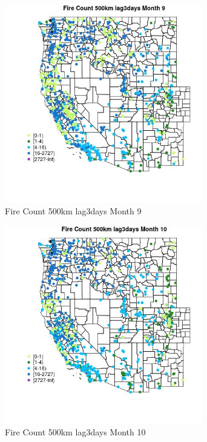 \begin{figure} 
\centering  
\includegraphics[width=0.77\textwidth]{Code_Outputs/Report_ML_input_PM25_Step4_part_f_de_duplicated_aveswNAs_MapObsMo9Fire_Count_500km_lag3days.jpg} 
\caption{\label{fig:Report_ML_input_PM25_Step4_part_f_de_duplicated_aveswNAsMapObsMo9Fire_Count_500km_lag3days}Fire Count 500km lag3days Month 9} 
\end{figure} 
 

\begin{figure} 
\centering  
\includegraphics[width=0.77\textwidth]{Code_Outputs/Report_ML_input_PM25_Step4_part_f_de_duplicated_aveswNAs_MapObsMo10Fire_Count_500km_lag3days.jpg} 
\caption{\label{fig:Report_ML_input_PM25_Step4_part_f_de_duplicated_aveswNAsMapObsMo10Fire_Count_500km_lag3days}Fire Count 500km lag3days Month 10} 
\end{figure} 
 

